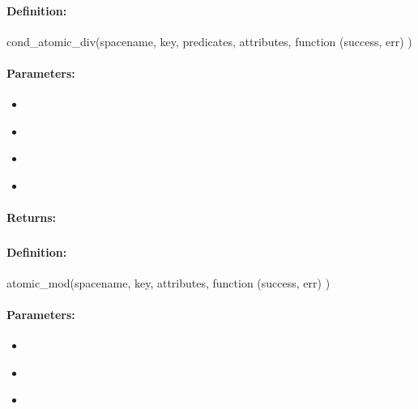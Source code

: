 \paragraph{Definition:}
\begin{javascriptcode}
cond_atomic_div(spacename, key, predicates, attributes, function (success, err) {})
\end{javascriptcode}
\paragraph{Parameters:}
\begin{itemize}[noitemsep]
\item {}\\

\item {}\\

\item {}\\

\item {}\\

\end{itemize}

\paragraph{Returns:}


\pagebreak
\subsubsection{}
\label{api:nodejs:atomic_mod}


\paragraph{Definition:}
\begin{javascriptcode}
atomic_mod(spacename, key, attributes, function (success, err) {})
\end{javascriptcode}
\paragraph{Parameters:}
\begin{itemize}[noitemsep]
\item {}\\

\item {}\\

\item {}\\

\end{itemize}

